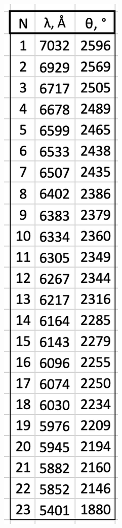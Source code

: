 \documentclass[a4paper, 12pt]{article}%
\begin{document}
\begin{enumerate}
	\begin{figure}[h!]
	    \centering
		\includegraphics[scale=0.6]{Таблица_1.PNG}
	\end{figure}
	

\end{enumerate}
\end{document}
